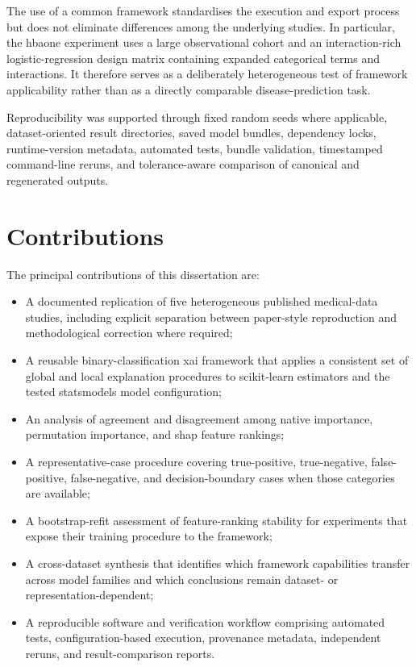 The use of a common framework standardises the execution and export process but does not eliminate differences among the underlying studies. In particular, the \gls{hbaone} experiment uses a large observational cohort and an interaction-rich logistic-regression design matrix containing expanded categorical terms and interactions. It therefore serves as a deliberately heterogeneous test of framework applicability rather than as a directly comparable disease-prediction task.

Reproducibility was supported through fixed random seeds where applicable, dataset-oriented result directories, saved model bundles, dependency locks, runtime-version metadata, automated tests, bundle validation, timestamped command-line reruns, and tolerance-aware comparison of canonical and regenerated outputs.


\section{Contributions}

The principal contributions of this dissertation are:

\begin{itemize}
    \item A documented replication of five heterogeneous published medical-data studies, including explicit separation between paper-style reproduction and methodological correction where required;
    \item A reusable binary-classification \gls{xai} framework that applies a consistent set of global and local explanation procedures to scikit-learn estimators and the tested statsmodels model configuration;
    \item An analysis of agreement and disagreement among native importance, permutation importance, and \gls{shap} feature rankings;
    \item A representative-case procedure covering true-positive, true-negative, false-positive, false-negative, and decision-boundary cases when those categories are available;
    \item A bootstrap-refit assessment of feature-ranking stability for experiments that expose their training procedure to the framework;
    \item A cross-dataset synthesis that identifies which framework capabilities transfer across model families and which conclusions remain dataset- or representation-dependent;
    \item A reproducible software and verification workflow comprising automated tests, configuration-based execution, provenance metadata, independent reruns, and result-comparison reports.
\end{itemize}

